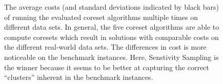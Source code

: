 \begin{figure}[H]
{ }
 \newline\newline
 \newline\newline
  \caption{The average costs (and standard deviations indicated by black bars) of running the evaluated coreset algorithms multiple times on different data sets. In general, the five coreset algorithms are able to compute coresets which result in solutions with comparable costs on the different real-world data sets. The differences in cost is more noticeable on the benchmark instances. Here, Senstivity Sampling is the winner because it seems to be better at capturing the correct ``clusters'' inherent in the benchmark instances.}
 \label{fig:real-costs}
\end{figure}

